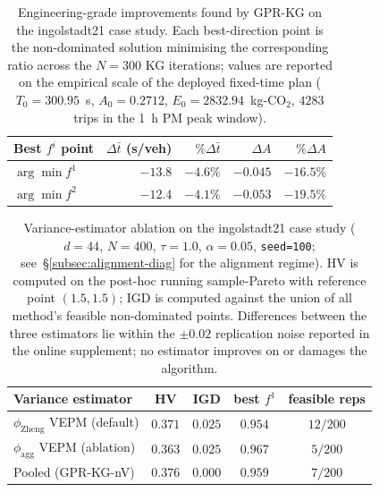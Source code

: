 
\begin{table}[t]
  \centering
  \caption{Engineering-grade improvements found by GPR-KG on the
  ingolstadt21 case study.  Each best-direction point is the
  non-dominated solution minimising the corresponding ratio across the
  $N=300$ KG iterations; values are reported on the empirical scale of
  the deployed fixed-time plan ($T_{0}=300.95$~s, $A_{0}=0.2712$,
  $E_{0}=2832.94$~kg-CO$_{2}$, $4283$ trips in the 1~h PM peak window).}
  \label{tab:case-improvements}
  \small
  \begin{tabular}{l r r r r}
    \toprule
    Best $f^{i}$ point & $\Delta\bar t$ (s/veh) & $\%\Delta\bar t$ &
       $\Delta A$ & $\%\Delta A$ \\
    \midrule
    $\arg\min f^{1}$ & $-13.8$ & $-4.6\%$ & $-0.045$ & $-16.5\%$ \\
    $\arg\min f^{2}$ & $-12.4$ & $-4.1\%$ & $-0.053$ & $-19.5\%$ \\
    \bottomrule
  \end{tabular}
\end{table}

\begin{table}[t]
  \centering
  \caption{Variance-estimator ablation on the ingolstadt21 case study
  ($d=44$, $N=400$, $\tau=1.0$, $\alpha=0.05$, \texttt{seed=100};
  see~\S\ref{subsec:alignment-diag} for the alignment regime).
  HV is computed on the post-hoc running sample-Pareto with reference
  point $(1.5,1.5)$; IGD is computed against the union of all method's
  feasible non-dominated points.  Differences between the three
  estimators lie within the $\pm 0.02$ replication noise reported in the
  online supplement; no estimator improves on or damages the algorithm.}
  \label{tab:case-vepm-vs-pooled}
  \small
  \begin{tabular}{l c c c c}
    \toprule
    Variance estimator & HV & IGD & best $f^{1}$ & feasible reps \\
    \midrule
    $\phi_{\mathrm{Zheng}}$ VEPM (default)    & $0.371$ & $0.025$ & $0.954$ & $12/200$ \\
    $\phi_{\mathrm{agg}}$ VEPM (ablation)     & $0.363$ & $0.025$ & $0.967$ & $5/200$  \\
    Pooled (GPR-KG-nV)                        & $0.376$ & $0.000$ & $0.959$ & $7/200$  \\
    \bottomrule
  \end{tabular}
\end{table}


